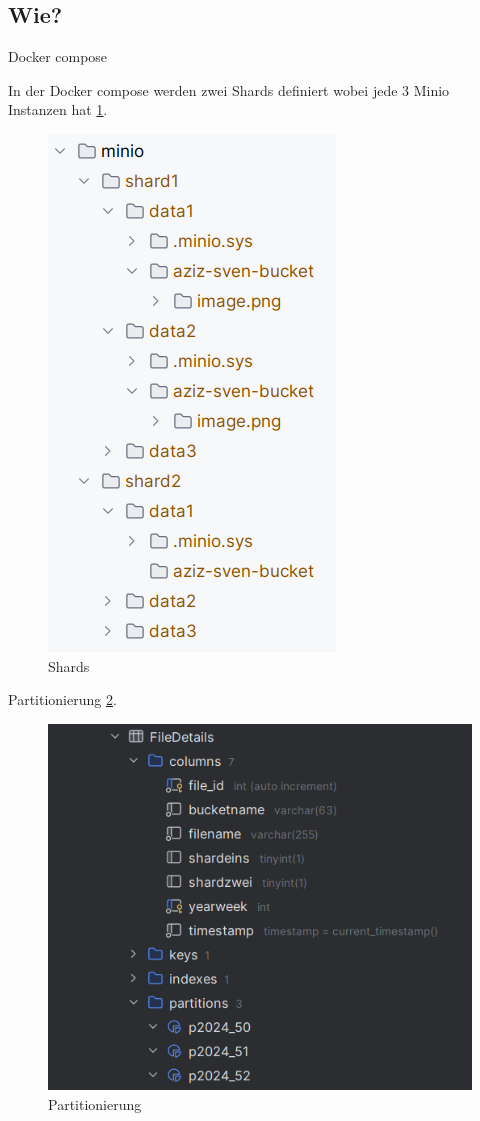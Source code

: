 \documentclass[12pt]{report}
\begin{document}
		\subsection{Wie?}
			Docker compose 
			
			In der Docker compose werden zwei Shards definiert wobei jede 3 Minio Instanzen hat \ref{fig:shards}. 
		
			\begin{figure}[h]
				\centering
				\includegraphics[width=0.4\linewidth]{shards}
				\caption{Shards}
				\label{fig:shards}
			\end{figure}
			
			Partitionierung \ref{fig:partitionierung}.
			
			\begin{figure}[h]
				\centering
				\includegraphics[width=0.8\linewidth]{partitionierung}
				\caption{Partitionierung}
				\label{fig:partitionierung}
			\end{figure}
			
\end{document}
